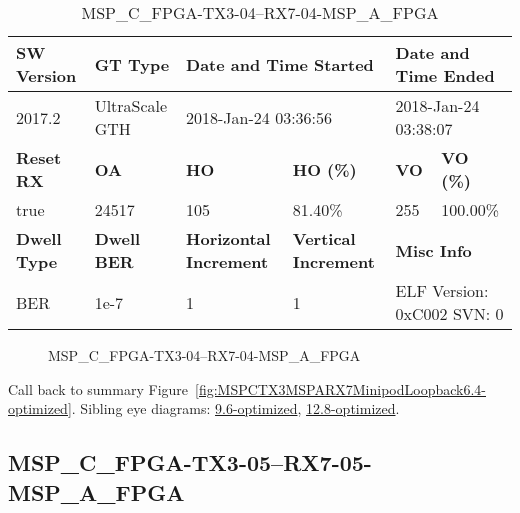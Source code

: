 \begin{table}[h]
\centering
\caption{MSP\_C\_FPGA-TX3-04--RX7-04-MSP\_A\_FPGA}
\label{tab:MSPCFPGATX304RX704MSPAFPGA6.4-optimized}
\begin{tabular}{@{}|l|l|l|l|l|l|@{}}
\toprule
\textbf{SW Version}                & \textbf{GT Type}   & \multicolumn{2}{l|}{\textbf{Date and Time Started}}            & \multicolumn{2}{l|}{\textbf{Date and Time Ended}}        \\ \midrule
2017.2                       & UltraScale GTH          & \multicolumn{2}{l|}{2018-Jan-24 03:36:56}                   & \multicolumn{2}{l|}{2018-Jan-24 03:38:07}               \\ \midrule
\textbf{Reset RX}                  & \textbf{OA} & \textbf{HO}   & \textbf{HO (\%)} & \textbf{VO} & \textbf{VO (\%)} \\ \midrule
true & 24517        & 105          & 81.40\%        & 255        & 100.00\%       \\ \midrule
\textbf{Dwell Type}                & \textbf{Dwell BER} & \textbf{Horizontal Increment} & \textbf{Vertical Increment}    & \multicolumn{2}{l|}{\textbf{Misc Info}}                  \\ \midrule
BER                            & 1e-7        & 1        & 1           & \multicolumn{2}{l|}{ELF Version: 0xC002 SVN: 0}                         \\ \bottomrule
\end{tabular}
\end{table}

\begin{figure}[h]
\caption{MSP\_C\_FPGA-TX3-04--RX7-04-MSP\_A\_FPGA} \label{fig:MSPCFPGATX304RX704MSPAFPGA6.4-optimized}
\end{figure}

Call back to summary Figure~\ref{fig:MSPCTX3MSPARX7MinipodLoopback6.4-optimized}.
Sibling eye diagrams: \hyperref[sec:MSPCFPGATX304RX704MSPAFPGA9.6-optimized]{9.6-optimized}, \hyperref[sec:MSPCFPGATX304RX704MSPAFPGA12.8-optimized]{12.8-optimized}.

\clearpage
\newpage


\subsection{MSP\_C\_FPGA-TX3-05--RX7-05-MSP\_A\_FPGA}\label{sec:MSPCFPGATX305RX705MSPAFPGA6.4-optimized}

